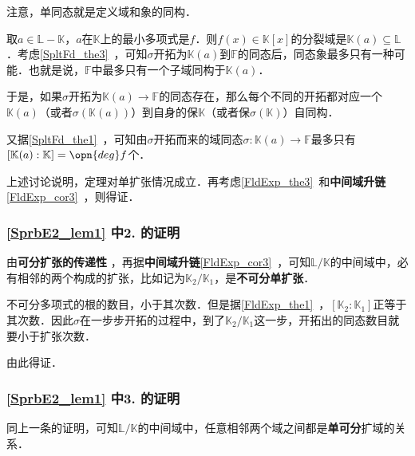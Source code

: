 

注意，单同态就是定义域和象的同构．

取$a\in\mathbb{L}-\mathbb{K}$，$a$在$\mathbb{K}$上的最小多项式是$f$．则$f(x)\in\mathbb{K}[x]$的分裂域是$\mathbb{K}(a)\subseteq\mathbb{L}$．考虑\autoref{SpltFd_the3}~，可知$\sigma$开拓为$\mathbb{K}(a)$到$\mathbb{F}$的同态后，同态象最多只有一种可能．也就是说，$\mathbb{F}$中最多只有一个子域同构于$\mathbb{K}(a)$．

于是，如果$\sigma$开拓为$\mathbb{K}(a)\to\mathbb{F}$的同态存在，那么每个不同的开拓都对应一个$\mathbb{K}(a)$（或者$\sigma(\mathbb{K}(a))$）到自身的保$\mathbb{K}$（或者保$\sigma(\mathbb{K})$）自同构．

又据\autoref{SpltFd_the1}~，可知由$\sigma$开拓而来的域同态$\sigma:\mathbb{K}(a)\to\mathbb{F}$最多只有$[\mathbb{K}(a):\mathbb{K}]=\opn{deg}f$个．

上述讨论说明，定理对单扩张情况成立．再考虑\autoref{FldExp_the3}~和\textbf{中间域升链}\autoref{FldExp_cor3}~，则得证．



\subsubsection{\autoref{SprbE2_lem1} 中2. 的证明}

由\textbf{可分扩张的传递性}%
，再据\textbf{中间域升链}\autoref{FldExp_cor3}~，可知$\mathbb{L}/\mathbb{K}$的中间域中，必有相邻的两个构成的扩张，比如记为$\mathbb{K}_2/\mathbb{K}_1$，是\textbf{不可分单扩张}．

不可分多项式的根的数目，小于其次数．但是据\autoref{FldExp_the1}~，$[\mathbb{K}_2:\mathbb{K}_1]$正等于其次数．因此$\sigma$在一步步开拓的过程中，到了$\mathbb{K}_2/\mathbb{K}_1$这一步，开拓出的同态数目就要小于扩张次数．

由此得证．


\subsubsection{\autoref{SprbE2_lem1} 中3. 的证明}

同上一条的证明，可知$\mathbb{L}/\mathbb{K}$的中间域中，任意相邻两个域之间都是\textbf{单可分}扩域的关系．

